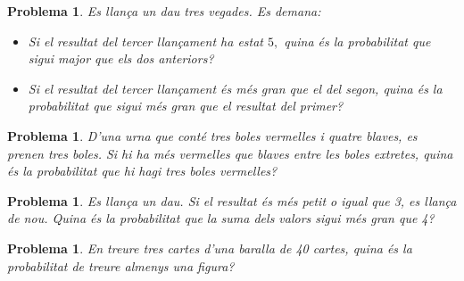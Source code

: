 \documentclass[11pt]{article}
\newcounter{prbcont}
\newtheorem{problema}[prbcont]{Problema}
\begin{document}
\begin{problema}
Es llan\c{c}a un dau tres vegades. Es demana: 
\begin{itemize}
\item [(a)] Si el resultat del tercer llan\c{c}ament ha estat $5,$ quina \'es la probabilitat que sigui major que els dos anteriors?
\item [(b)] Si el resultat del tercer llan\c{c}ament \'es m\'es gran que el del segon, quina \'es la probabilitat que sigui m\'es gran que el resultat del primer?
\end{itemize}
\end{problema}

\begin{problema}
D'una urna que cont\'e tres boles vermelles i quatre blaves, es prenen tres boles. Si hi ha m\'es vermelles que blaves entre les boles extretes, quina \'es la probabilitat que hi hagi tres boles vermelles?
\end{problema}

\begin{problema}
Es llan\c{c}a un dau. Si el resultat \'es m\'es petit o igual que 3, es llan\c{c}a de nou. Quina \'es la probabilitat que la suma dels valors sigui m\'es gran que 4?
\end{problema}



\begin{problema}
En treure tres cartes d'una baralla de 40 cartes, quina \'es la probabilitat de treure almenys una figura?
\end{problema}

\end{document}
